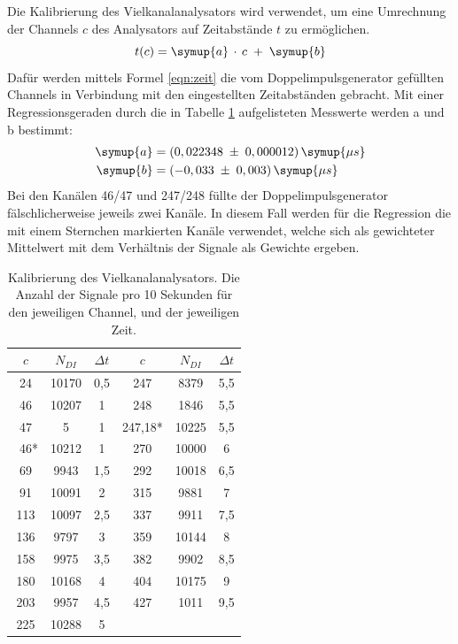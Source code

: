 Die Kalibrierung des Vielkanalanalysators wird verwendet, um eine Umrechnung der
Channels $c$ des Analysators auf Zeitabstände $t$ zu ermöglichen.
\begin{equation}
  t(c) = \symup{a}\,\cdot\,c\;+\;\symup{b}
  \label{eqn:zeit}
\end{equation}
Dafür werden mittels Formel \ref{eqn:zeit}
die vom Doppelimpulsgenerator gefüllten Channels in Verbindung mit den eingestellten
Zeitabständen gebracht. Mit einer Regressionsgeraden durch die in Tabelle \ref{tab:zeit} aufgelisteten Messwerte werden a und b bestimmt:
\begin{align*}
  \symup{a} &= (0,022348\;\pm\;0,000012)\,\symup{\mu s}\\
  \symup{b} &= (-0,033\;\pm\;0,003)\,\symup{\mu s}\\
\end{align*}
Bei den Kanälen 46/47 und 247/248 füllte der Doppelimpulsgenerator fälschlicherweise jeweils zwei Kanäle.
In diesem Fall werden für die Regression die mit einem Sternchen markierten Kanäle verwendet, welche sich als
gewichteter Mittelwert mit dem Verhältnis der Signale als Gewichte ergeben.
\begin{table}
  \centering
  \caption{Kalibrierung des Vielkanalanalysators. Die Anzahl der Signale pro 10 Sekunden für den jeweiligen Channel, und der jeweiligen Zeit.}
  \label{tab:zeit}
  \begin{tabular}{c c c | c c c}
    \toprule
    $c$ & $N_{DI}$ & $\Delta t$ & $c$ & $N_{DI}$ & $\Delta t$\\
    \midrule
    24   & 10170 & 0,5 & 247    & 8379 & 5,5\\
    46   & 10207 &  1  & 248    & 1846 & 5,5\\
    47   & 5     &  1  & 247,18* & 10225 & 5,5\\
    ~46* & 10212 &  1  & 270    & 10000 &  6 \\
    69   & 9943  & 1,5 & 292    & 10018 & 6,5\\
    91   & 10091 &  2  & 315    & 9881  & 7  \\
    113  & 10097 & 2,5 & 337    & 9911  & 7,5\\
    136  & 9797  &  3  & 359    & 10144 & 8  \\
    158  & 9975  & 3,5 & 382    & 9902  & 8,5\\
    180  & 10168 &  4  & 404    & 10175 & 9  \\
    203  & 9957  & 4,5 & 427    & 1011  & 9,5\\
    225  & 10288 &  5  &                      \\
    \bottomrule
  \end{tabular}
\end{table}

